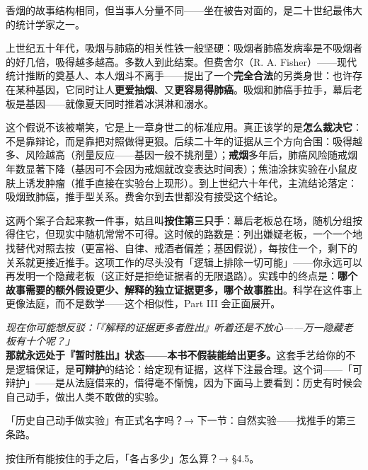 \documentclass[../../main2.tex]{subfiles}
\begin{document}
	香烟的故事结构相同，但当事人分量不同——坐在被告对面的，是二十世纪最伟大的统计学家之一。

	上世纪五十年代，吸烟与肺癌的相关性铁一般坚硬：吸烟者肺癌发病率是不吸烟者的好几倍，吸得越多越高。多数人到此结案。但费舍尔（R. A. Fisher）——现代统计推断的奠基人、本人烟斗不离手——提出了一个\textbf{完全合法}的另类身世：也许存在某种基因，它同时让人\textbf{更爱抽烟}、又\textbf{更容易得肺癌}。吸烟和肺癌手拉手，幕后老板是基因——就像夏天同时推着冰淇淋和溺水。

	这个假说不该被嘲笑，它是上一章身世二的标准应用。真正该学的是\textbf{怎么裁决它}：不是靠辩论，而是靠把对照做得更狠。后续二十年的证据从三个方向合围：吸得越多、风险越高（剂量反应——基因一般不挑剂量）；\textbf{戒烟}多年后，肺癌风险随戒烟年数显著下降（基因可不会因为戒烟就改变表达时间表）；焦油涂抹实验在小鼠皮肤上诱发肿瘤（推手直接在实验台上现形）。到上世纪六十年代，主流结论落定：吸烟致肺癌，推手型关系。费舍尔到去世都没有接受这个结论。

	这两个案子合起来教一件事，姑且叫\textbf{按住第三只手}：幕后老板总在场，随机分组按得住它，但现实中随机常常不可得。这时候的路数是：列出嫌疑老板，一个一个地找替代对照去按（更富裕、自律、戒酒者偏差；基因假说），每按住一个，剩下的关系就更接近推手。这项工作的尽头没有「逻辑上排除一切可能」——你永远可以再发明一个隐藏老板（这正好是拒绝证据者的无限退路）。实践中的终点是：\textbf{哪个故事需要的额外假设更少、解释的独立证据更多，哪个故事胜出}。科学在这件事上更像法庭，而不是数学——这个相似性，Part III 会正面展开。

	\begin{questionbox}
		\textit{现在你可能想反驳：「『解释的证据更多者胜出』听着还是不放心——万一隐藏老板有十个呢？」}\\
		\textbf{那就永远处于『暂时胜出』状态——本书不假装能给出更多。}这套手艺给你的不是逻辑保证，是\textbf{可辩护}的结论：给定现有证据，这样下注最合理。这个词——「可辩护」——是从法庭借来的，借得毫不惭愧，因为下面马上要看到：历史有时候会自己动手，做出人类不敢做的实验。
	\end{questionbox}

	\begin{reader_anticipation}
		\item 「历史自己动手做实验」有正式名字吗？→ 下一节：自然实验——找推手的第三条路。
		\item 按住所有能按住的手之后，「各占多少」怎么算？→ §4.5。
	\end{reader_anticipation}
\end{document}

